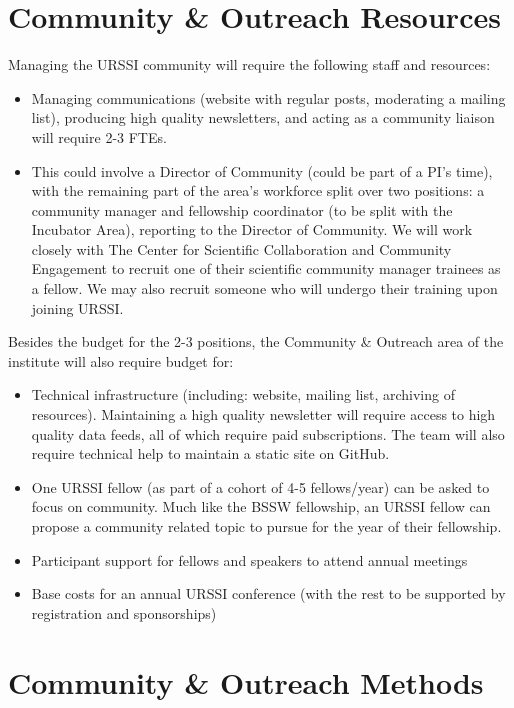 \documentclass[
]{book}
\begin{document}
\hypertarget{community-outreach-resources}{%
\section{Community \& Outreach Resources}\label{community-outreach-resources}}

Managing the URSSI community will require the following staff and resources:

\begin{itemize}
\item
  Managing communications (website with regular posts, moderating a mailing list), producing high quality newsletters, and acting as a community liaison will require 2-3 FTEs.
\item
  This could involve a Director of Community (could be part of a PI's time), with the remaining part of the area's workforce split over two positions: a community manager and fellowship coordinator (to be split with the Incubator Area), reporting to the Director of Community. We will work closely with The Center for Scientific Collaboration and Community Engagement to recruit one of their scientific community manager trainees as a fellow. We may also recruit someone who will undergo their training upon joining URSSI.
\end{itemize}

Besides the budget for the 2-3 positions, the Community \& Outreach area of the institute will also require budget for:

\begin{itemize}
\item
  Technical infrastructure (including: website, mailing list, archiving of resources). Maintaining a high quality newsletter will require access to high quality data feeds, all of which require paid subscriptions. The team will also require technical help to maintain a static site on GitHub.
\item
  One URSSI fellow (as part of a cohort of 4-5 fellows/year) can be asked to focus on community. Much like the BSSW fellowship, an URSSI fellow can propose a community related topic to pursue for the year of their fellowship.
\item
  Participant support for fellows and speakers to attend annual meetings
\item
  Base costs for an annual URSSI conference (with the rest to be supported by registration and sponsorships)
\end{itemize}

\hypertarget{community-outreach-methods}{%
\section{Community \& Outreach Methods}\label{community-outreach-methods}}
\end{document}
